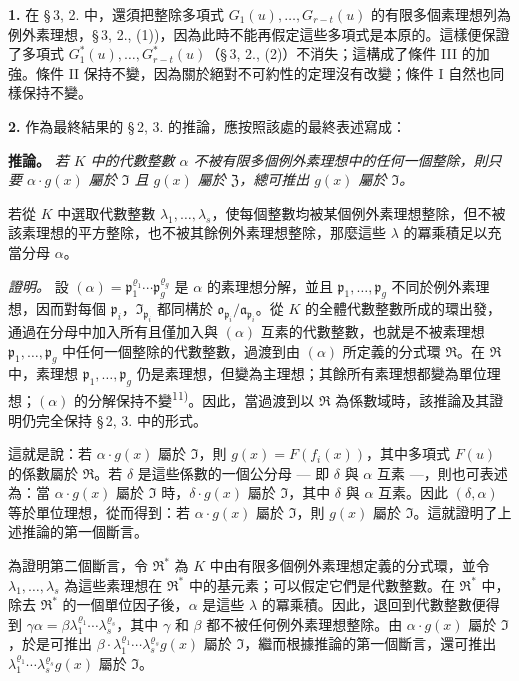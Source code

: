 \documentclass[11pt]{article}
\begin{document}
\medskip\noindent\textbf{1.}
在 \S\,3, 2. 中，還須把整除多項式 $G_1(u),\ldots,G_{r-t}(u)$ 的有限多個素理想列為例外素理想，\S\,3, 2., (1))，因為此時不能再假定這些多項式是本原的。這樣便保證了多項式 $G^*_1(u),\ldots,G^*_{r-t}(u)$（\S\,3, 2., (2)）不消失；這構成了條件 III 的加強。條件 II 保持不變，因為關於絕對不可約性的定理沒有改變；條件 I 自然也同樣保持不變。

\medskip\noindent\textbf{2.}
作為最終結果的 \S\,2, 3. 的推論，應按照該處的最終表述寫成：

\noindent\textbf{推論。}
\textit{若 $K$ 中的代數整數 $\alpha$ 不被有限多個例外素理想中的任何一個整除，則只要 $\alpha \cdot g(x)$ 屬於 $\mathfrak{I}$ 且 $g(x)$ 屬於 $\mathfrak{Z}$，總可推出 $g(x)$ 屬於 $\mathfrak{I}$。}

若從 $K$ 中選取代數整數 $\lambda_1,\ldots,\lambda_s$，使每個整數均被某個例外素理想整除，但不被該素理想的平方整除，也不被其餘例外素理想整除，那麼這些 $\lambda$ 的冪乘積足以充當分母 $\alpha$。

\noindent\textit{證明。}
設 $(\alpha) = \mathfrak{p}_1^{\varrho_1} \cdots \mathfrak{p}_g^{\varrho_g}$ 是 $\alpha$ 的素理想分解，並且 $\mathfrak{p}_1,\ldots,\mathfrak{p}_g$ 不同於例外素理想，因而對每個 $\mathfrak{p}_i$，$\mathfrak{I}_{\mathfrak{p}_i}$ 都同構於 $\mathfrak{o}_{\mathfrak{p}_i}/\mathfrak{a}_{\mathfrak{p}_i}$。從 $K$ 的全體代數整數所成的環出發，通過在分母中加入所有且僅加入與 $(\alpha)$ 互素的代數整數，也就是不被素理想 $\mathfrak{p}_1,\ldots,\mathfrak{p}_g$ 中任何一個整除的代數整數，過渡到由 $(\alpha)$ 所定義的分式環 $\mathfrak{R}$。在 $\mathfrak{R}$ 中，素理想 $\mathfrak{p}_1,\ldots,\mathfrak{p}_g$ 仍是素理想，但變為主理想；其餘所有素理想都變為單位理想；$(\alpha)$ 的分解保持不變\textsuperscript{11)}。因此，當過渡到以 $\mathfrak{R}$ 為係數域時，該推論及其證明仍完全保持 \S\,2, 3. 中的形式。

這就是說：若 $\alpha \cdot g(x)$ 屬於 $\mathfrak{I}$，則 $g(x) = F(f_i(x))$，其中多項式 $F(u)$ 的係數屬於 $\mathfrak{R}$。若 $\delta$ 是這些係數的一個公分母 --- 即 $\delta$ 與 $\alpha$ 互素 ---，則也可表述為：當 $\alpha \cdot g(x)$ 屬於 $\mathfrak{I}$ 時，$\delta \cdot g(x)$ 屬於 $\mathfrak{I}$，其中 $\delta$ 與 $\alpha$ 互素。因此 $(\delta, \alpha)$ 等於單位理想，從而得到：若 $\alpha \cdot g(x)$ 屬於 $\mathfrak{I}$，則 $g(x)$ 屬於 $\mathfrak{I}$。這就證明了上述推論的第一個斷言。

為證明第二個斷言，令 $\mathfrak{R}^*$ 為 $K$ 中由有限多個例外素理想定義的分式環，並令 $\lambda_1,\ldots,\lambda_s$ 為這些素理想在 $\mathfrak{R}^*$ 中的基元素；可以假定它們是代數整數。在 $\mathfrak{R}^*$ 中，除去 $\mathfrak{R}^*$ 的一個單位因子後，$\alpha$ 是這些 $\lambda$ 的冪乘積。因此，退回到代數整數便得到 $\gamma\alpha = \beta \lambda_1^{\varrho_1} \cdots \lambda_s^{\varrho_s}$，其中 $\gamma$ 和 $\beta$ 都不被任何例外素理想整除。由 $\alpha \cdot g(x)$ 屬於 $\mathfrak{I}$，於是可推出 $\beta \cdot \lambda_1^{\varrho_1} \cdots \lambda_s^{\varrho_s} g(x)$ 屬於 $\mathfrak{I}$，繼而根據推論的第一個斷言，還可推出 $\lambda_1^{\varrho_1} \cdots \lambda_s^{\varrho_s} g(x)$ 屬於 $\mathfrak{I}$。
\end{document}
